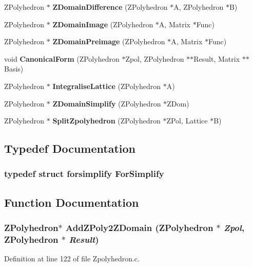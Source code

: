 \begin{CompactItemize}
\item 
ZPolyhedron $\ast$ {\bf ZDomain\-Difference} (ZPolyhedron $\ast$A, ZPolyhedron $\ast$B)
\item 
ZPolyhedron $\ast$ {\bf ZDomain\-Image} (ZPolyhedron $\ast$A, Matrix $\ast$Func)
\item 
ZPolyhedron $\ast$ {\bf ZDomain\-Preimage} (ZPolyhedron $\ast$A, Matrix $\ast$Func)
\item 
void {\bf Canonical\-Form} (ZPolyhedron $\ast$Zpol, ZPolyhedron $\ast$$\ast$Result, Matrix $\ast$$\ast$Basis)
\item 
ZPolyhedron $\ast$ {\bf Integralise\-Lattice} (ZPolyhedron $\ast$A)
\item 
ZPolyhedron $\ast$ {\bf ZDomain\-Simplify} (ZPolyhedron $\ast$ZDom)
\item 
ZPolyhedron $\ast$ {\bf Split\-Zpolyhedron} (ZPolyhedron $\ast$ZPol, Lattice $\ast$B)
\end{CompactItemize}


\subsection{Typedef Documentation}
\subsubsection{\setlength{\rightskip}{0pt plus 5cm}typedef struct {\bf forsimplify}  For\-Simplify}\label{Zpolyhedron_8c_a0}




\subsection{Function Documentation}
\subsubsection{\setlength{\rightskip}{0pt plus 5cm}ZPolyhedron$\ast$ Add\-ZPoly2ZDomain (ZPolyhedron $\ast$ {\em Zpol}, ZPolyhedron $\ast$ {\em Result})\hspace{0.3cm}{\tt  [static]}}\label{Zpolyhedron_8c_a13}




Definition at line 122 of file Zpolyhedron.c.

